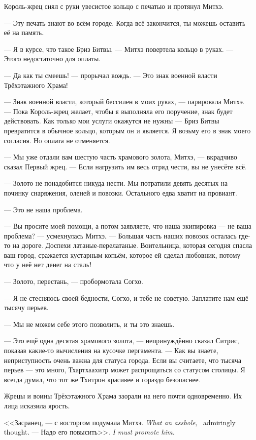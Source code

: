 Король-жрец снял с руки увесистое кольцо с печатью и протянул Митхэ.

--- Эту печать знают во всём городе.
Когда всё закончится, ты можешь оставить её на память.

--- Я в курсе, что такое Бриз Битвы, --- Митхэ повертела кольцо в руках.
--- Этого недостаточно для оплаты.

--- Да как ты смеешь! --- прорычал вождь.
--- Это знак военной власти Трёхэтажного Храма!

--- Знак военной власти, который бессилен в моих руках, --- парировала Митхэ.
--- Пока Король-жрец желает, чтобы я выполняла его поручение, знак будет действовать.
Как только мои услуги окажутся не нужны --- Бриз Битвы превратится в обычное кольцо, которым он и является.
Я возьму его в знак моего согласия.
Но оплата не отменяется.

--- Мы уже отдали вам шестую часть храмового золота, Митхэ, --- вкрадчиво сказал Первый жрец.
--- Если нагрузить им весь отряд чести, вы не унесёте всё.

--- Золото не понадобится никуда нести.
Мы потратили девять десятых на починку снаряжения, оленей и повозки.
Остального едва хватит на провиант.

--- Это не наша проблема.

--- Вы просите моей помощи, а потом заявляете, что наша экипировка --- не ваша проблема? --- усмехнулась Митхэ.
--- Большая часть наших повозок осталась где-то на дороге.
Доспехи латаные-перелатаные.
Воительница, которая сегодня спасла ваш город, сражается кустарным копьём, которое ей сделал любовник, потому что у неё нет денег на сталь!

--- Золото, перестань, --- пробормотала Согхо.

--- Я не стесняюсь своей бедности, Согхо, и тебе не советую.
Заплатите нам ещё тысячу перьев.

--- Мы не можем себе этого позволить, и ты это знаешь.

--- Это ещё одна десятая храмового золота, --- непринуждённо сказал Ситрис, показав какие-то вычисления на кусочке пергамента.
--- Как вы знаете, неприступность очень важна для статуса города.
Если вы считаете, что тысяча перьев --- это много, Тхартхаахитр может распрощаться со статусом столицы.
Я всегда думал, что тот же Тхитрон красивее и гораздо безопаснее.

Жрецы и воины Трёхэтажного Храма заорали на него почти одновременно.
Их лица исказила ярость.

{<<Засранец, --- с восторгом подумала Митхэ.}
{\textit{What an asshole,} \Mitchoe\ admiringly thought.}
{--- Надо его повысить>>.}
{\textit{I must promote him.}}

